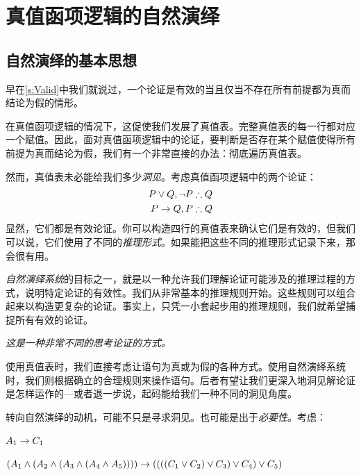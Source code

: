 \part{真值函项逻辑的自然演绎}
\label{ch.NDTFL}

\chapter{自然演绎的基本思想}\label{s:NDVeryIdea}

早在\cref{s:Valid}中我们就说过，一个论证是有效的当且仅当不存在所有前提都为真而结论为假的情形。

在真值函项逻辑的情况下，这促使我们发展了真值表。完整真值表的每一行都对应一个赋值。因此，面对真值函项逻辑中的论证，要判断是否存在某个赋值使得所有前提为真而结论为假，我们有一个非常直接的办法：彻底遍历真值表。

然而，真值表未必能给我们多少\emph{洞见}。考虑真值函项逻辑中的两个论证：
\begin{align*}
P \eor Q, \enot P & \therefore Q\\
P \eif Q, P & \therefore Q
\end{align*}
显然，它们都是有效论证。你可以构造四行的真值表来确认它们是有效的，但我们可以说，它们使用了不同的\emph{推理形式}。如果能把这些不同的推理形式记录下来，那会很有用。

\emph{自然演绎系统}的目标之一，就是以一种允许我们理解论证可能涉及的推理过程的方式，说明特定论证的有效性。我们从非常基本的推理规则开始。这些规则可以组合起来以构造更复杂的论证。事实上，只凭一小套起步用的推理规则，我们就希望捕捉所有有效的论证。

\emph{这是一种非常不同的思考论证的方式。}

使用真值表时，我们直接考虑让语句为真或为假的各种方式。使用自然演绎系统时，我们则根据确立的合理规则来操作语句。后者有望让我们更深入地洞见解论证是怎样运作的---或者退一步说，起码能给我们一种不同的洞见角度。

转向自然演绎的动机，可能不只是寻求洞见。也可能是出于\emph{必要性}。考虑：
\ifHTMLtarget


\begin{earg}
	\item $A_1 \rightarrow C_1$
	\item[\texttherefore] $(A_1 \wedge (A_2 \wedge (A_3 \wedge (A_4 \wedge A_5)))) \rightarrow
	((((C_1 \vee C_2) \vee C_3) \vee C_4) \vee C_5)$
\end{earg}


